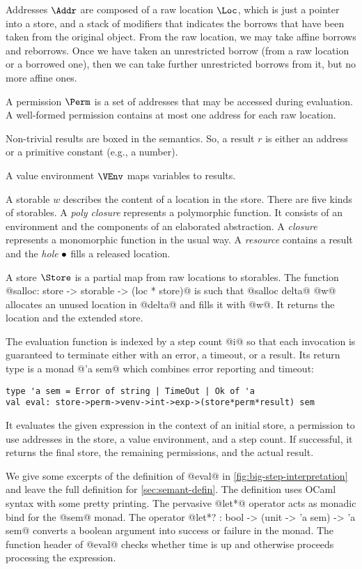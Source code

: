 Addresses $\Addr$ are composed of a raw location $\Loc$, which is just
a pointer into a store, and a stack of modifiers that indicates the
borrows that have been taken from the original object. From the raw
location, we may take affine borrows and reborrows. Once we have
taken an unrestricted borrow (from a raw location or a borrowed one),
then we can take further unrestricted borrows from it, but no more
affine ones.

A permission $\Perm$ is a set of addresses that may be accessed during
evaluation. A well-formed permission contains at most one address for each raw
location.

Non-trivial results are boxed in the  semantics. So, a result
$r$ is either an address or a primitive constant (e.g., a number).

A value environment $\VEnv$  maps variables to results.

A storable $w$ describes the content of a location in the store. There are five
kinds of storables. A \emph{poly closure} represents a polymorphic
function. It consists of an environment and the components of an
elaborated abstraction. A \emph{closure} represents a monomorphic
function in the usual way.
A \emph{resource} contains
a result and the \emph{hole} $\bullet$ fills a released location.

A store $\Store$ is a partial map from raw locations to
storables. The function
@salloc: store -> storable -> (loc * store)@ is such that
@salloc delta@ @w@ allocates an unused location in @delta@ and fills it with
@w@. It returns the location and the extended store.


The evaluation function is indexed by a step count @i@ so that each
invocation is guaranteed to terminate either with an error, a timeout,
or a result. Its return type is a monad
@'a sem@ which combines error reporting and timeout:
\begin{lstlisting}
type 'a sem = Error of string | TimeOut | Ok of 'a
val eval: store->perm->venv->int->exp->(store*perm*result) sem
\end{lstlisting}
It evaluates the given expression in the context of an initial store, a
permission to use addresses in the store, a value environment, and a
step count. If successful, it returns the final store, the remaining
permissions, and the actual result.



We give some excerpts of the definition of @eval@ in
\cref{fig:big-step-interpretation} and leave the full
definition for \cref{sec:semant-defin}.
The definition uses OCaml syntax with some pretty
printing. The pervasive @let*@ operator acts as monadic bind
for the @sem@ monad. The operator
@let*? : bool -> (unit -> 'a sem) -> 'a sem@
 converts a boolean
argument into success or failure in the monad.
 The function header of @eval@ checks
whether time is up and otherwise proceeds processing the expression.

